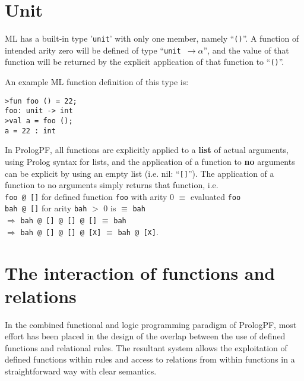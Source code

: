 \section{Unit} %
\label{unit}

ML has a built-in type '\texttt{unit}' with only one member, namely
 ``\texttt{()}''.
A function of intended arity zero will be defined of type
``\texttt{unit $\rightarrow \alpha$}'', and 
the value of that function will be returned by the explicit application
of that function to ``\texttt{()}''.

An example ML function definition of this type is:
\begin{verbatim}
>fun foo () = 22;
foo: unit -> int
>val a = foo ();
a = 22 : int
\end{verbatim}
In PrologPF, all functions are explicitly applied to a \textbf{list} of
actual arguments, using Prolog syntax for lists, and the application of
a function to \textbf{no} arguments can be explicit by using an empty
list (i.e. nil: ``\texttt{[]}'').  The application of a function to no
arguments simply returns that function, i.e.\\
\texttt{foo @ []} for defined function \texttt{foo} with arity 0 $\equiv$ evaluated \texttt{foo}\\
\texttt{bah @ []} for arity \texttt{bah} $>$ 0 is $\equiv$ \texttt{bah}\\
$\Rightarrow$ \texttt{bah @ [] @ [] @ []} $\equiv$ \texttt{bah}\\
$\Rightarrow$ \texttt{bah @ [] @ [] @ [X]} $\equiv$ \texttt{bah @ [X]}.

\section{The interaction of functions and relations} %

In the combined functional and logic programming paradigm of PrologPF, most
effort has been placed in the design of the overlap between the use of
defined functions and relational rules.  The resultant system allows the
exploitation of defined functions within rules and access to relations from
within functions in a straightforward way with clear semantics.

